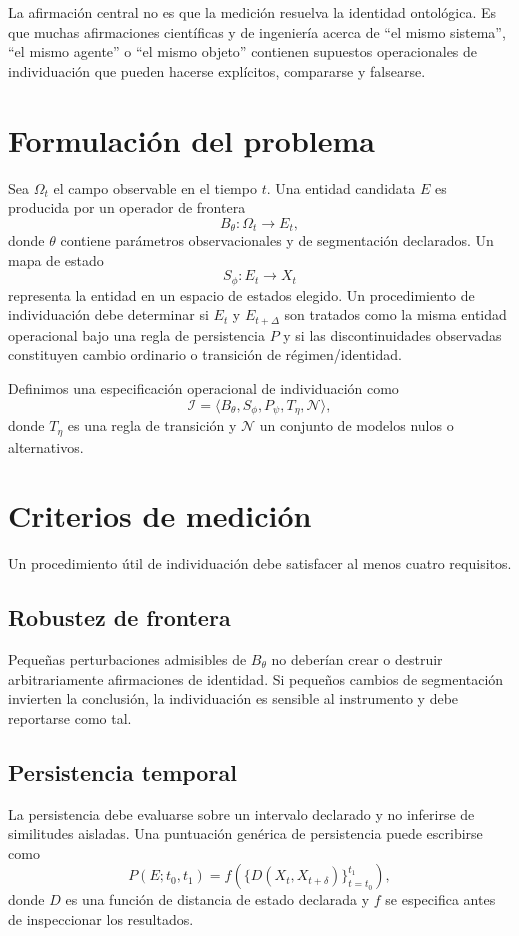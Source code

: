 \documentclass[11pt]{article}
\begin{document}
La afirmación central no es que la medición resuelva la identidad ontológica. Es que muchas afirmaciones científicas y de ingeniería acerca de ``el mismo sistema'', ``el mismo agente'' o ``el mismo objeto'' contienen supuestos operacionales de individuación que pueden hacerse explícitos, compararse y falsearse.

\section{Formulación del problema}
Sea $\Omega_t$ el campo observable en el tiempo $t$. Una entidad candidata $E$ es producida por un operador de frontera
\[
B_{\theta}: \Omega_t \rightarrow E_t,
\]
donde $\theta$ contiene parámetros observacionales y de segmentación declarados. Un mapa de estado
\[
S_{\phi}: E_t \rightarrow X_t
\]
representa la entidad en un espacio de estados elegido. Un procedimiento de individuación debe determinar si $E_t$ y $E_{t+\Delta}$ son tratados como la misma entidad operacional bajo una regla de persistencia $P$ y si las discontinuidades observadas constituyen cambio ordinario o transición de régimen/identidad.

Definimos una especificación operacional de individuación como
\[
\mathcal{I}=\langle B_{\theta},S_{\phi},P_{\psi},T_{\eta},\mathcal{N}\rangle,
\]
donde $T_{\eta}$ es una regla de transición y $\mathcal{N}$ un conjunto de modelos nulos o alternativos.

\section{Criterios de medición}
Un procedimiento útil de individuación debe satisfacer al menos cuatro requisitos.

\subsection{Robustez de frontera}
Pequeñas perturbaciones admisibles de $B_{\theta}$ no deberían crear o destruir arbitrariamente afirmaciones de identidad. Si pequeños cambios de segmentación invierten la conclusión, la individuación es sensible al instrumento y debe reportarse como tal.

\subsection{Persistencia temporal}
La persistencia debe evaluarse sobre un intervalo declarado y no inferirse de similitudes aisladas. Una puntuación genérica de persistencia puede escribirse como
\[
P(E;t_0,t_1)=f\left(\{D(X_t,X_{t+\delta})\}_{t=t_0}^{t_1}\right),
\]
donde $D$ es una función de distancia de estado declarada y $f$ se especifica antes de inspeccionar los resultados.
\end{document}

